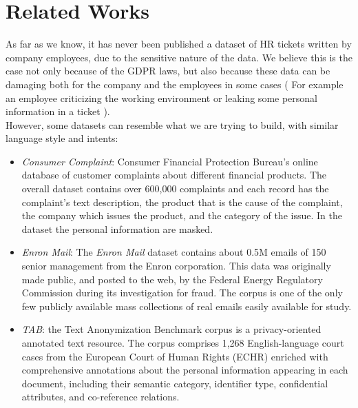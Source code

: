 \chapter{Related Works}
\label{sec:RelatedWorks}

As far as we know, it has never been published a dataset of HR tickets written by company employees, due to the sensitive nature of the data. We believe this is the case not only because of the GDPR laws, but also because these data can be damaging both for the company and the employees in some cases ( For example an employee criticizing the working environment or leaking some personal information in a ticket ).  \\
However, some datasets can resemble what we are trying to build, with similar language style and intents:
\begin{itemize}
    \item \textit{Consumer Complaint}: Consumer Financial Protection Bureau's online database of customer complaints about different financial products. The overall dataset contains over 600,000 complaints and each record has the complaint's text description, the product that is the cause of the complaint, the company which issues the product, and the category of the issue. In the dataset the personal information are masked.
    \item \textit{Enron Mail}: The \textit{Enron Mail} dataset contains about 0.5M emails of 150 senior management from the Enron corporation. This data was originally made public, and posted to the web, by the Federal Energy Regulatory Commission during its investigation for fraud. The corpus is one of the only few publicly available mass collections of real emails easily available for study.
    \item \textit{TAB}: the Text Anonymization Benchmark corpus\cite{pilan2022text} is a privacy-oriented annotated text resource. The corpus comprises 1,268 English-language court cases from the European Court of Human Rights (ECHR) enriched with comprehensive annotations about the personal information appearing in each document, including their semantic category, identifier type, confidential
    attributes, and co-reference relations.
\end{itemize}
